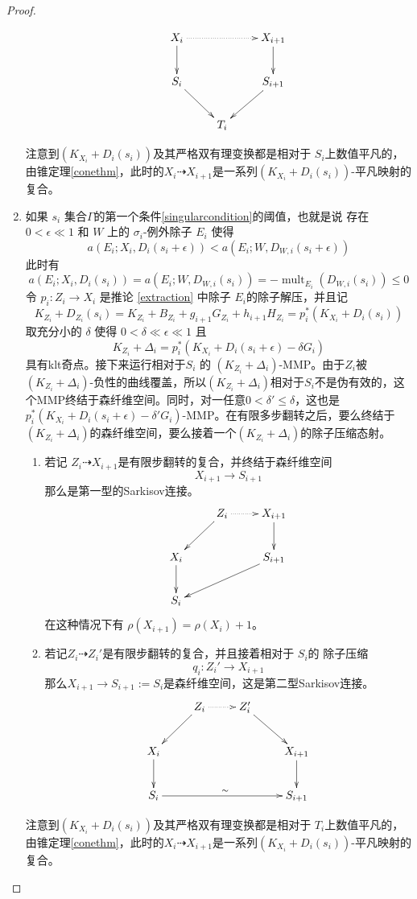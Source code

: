 \begin{proof}
\begin{enumerate}
\begin{enumerate}
      \[ \xymatrix{
          X_{i}\ar@{.>}[rr]\ar[d]& &X_{i+1}\ar[d] \\
          S_{i}\ar[rd]& & S_{i+1}\ar[ld]\\
             &T_{i}& } \]
  \end{enumerate}
  注意到$ (K_{X_{i}}+D_{i}(s_{i})) $及其严格双有理变换都是相对于 $S_{i}$上数值平凡的，由锥定理\ref{conethm}，此时的$X_{i}\dashrightarrow X_{i+1}$是一系列$ (K_{X_{i}}+D_{i}(s_{i}))$-平凡映射的复合。
    \item 如果 $s_{i}$ 集合$\Gamma$的第一个条件\ref{singularcondition}的阈值，也就是说 存在  $0<\epsilon \ll 1$ 和 $W$ 上的  $\sigma_{i}$-例外除子 $E_{i}$ 使得
  \[ a(E_{i};X_{i},D_{i}(s_{i}+\epsilon))< a(E_{i};W,D_{W,i}(s_{i}+\epsilon)) \]
  此时有
  \[ a(E_{i};X_{i},D_{i}(s_{i}))= a(E_{i};W,D_{W,i}(s_{i}))=-\operatorname{mult}_{E_{i}}(D_{W,i}(s_{i}))\leqslant 0 \]
  令 $p_{i}:Z_{i}\to X_{i}$ 是推论 \ref{extraction} 中除子 $E_{i}$的除子解压，并且记
  \[K_{Z_{i}}+D_{Z_{i}}(s_{i})=K_{Z_{i}}+B_{Z_{i}}+g_{i+1}G_{Z_{i}}+h_{i+1}H_{Z_{i}}=p_{i}^*\left(K_{X_{i}}+D_{i}\left(s_{i}\right)\right)\]
  取充分小的 $\delta$ 使得 $0<\delta \ll \epsilon \ll 1$ 且
  \[ K_{Z_{i}}+\Delta_{i}=p_{i}^*(K_{X_{i}}+D_{i}(s_{i}+\epsilon)-\delta G_{i}) \]
  具有klt奇点。接下来运行相对于$S_{i}$ 的 $(K_{Z_{i}}+\Delta_{i})$-MMP。由于$Z_{i}$被$(K_{Z_{i}}+\Delta_{i})$-负性的曲线覆盖，所以$(K_{Z_{i}}+\Delta_{i})$相对于$S_{i}$不是伪有效的，这个MMP终结于森纤维空间。同时，对一任意$0<\delta'\leqslant\delta$，这也是$p_{i}^*(K_{X_{i}}+D_{i}(s_{i}+\epsilon)-\delta'G_{i})$-MMP。在有限多步翻转之后，要么终结于$(K_{Z_{i}}+\Delta_{i})$的森纤维空间，要么接着一个$(K_{Z_{i}}+\Delta_{i})$的除子压缩态射。
  \begin{enumerate}
    \item 若记 $Z_{i}\dashrightarrow X_{i+1}$是有限步翻转的复合，并终结于森纤维空间
      \[X_{i+1}\to S_{i+1}\]
      那么是第一型的Sarkisov连接。 
      \[ \xymatrix{
        &Z_{i}\ar@{.>}[r]\ar[ld] &X_{i+1}\ar[d] \\
          X_{i}\ar[d]& &S_{i+1}\ar[lld]\\
          S_{i}   & & } \]
      在这种情况下有 $\rho(X_{i+1})=\rho(X_{i})+1$。
    \item 若记$Z_{i}\dashrightarrow Z_{i}'$是有限步翻转的复合，并且接着相对于 $S_{i}$的 除子压缩
      \[q_{i}:Z_{i}'\to X_{i+1}\]
     那么$X_{i+1}\to S_{i+1}:=S_{i}$是森纤维空间，这是第二型Sarkisov连接。
      \[ \xymatrix{
                               & Z_{i}\ar@{.>}[r]\ar[ld] & Z_{i}'\ar[rd] \\
          X_{i}\ar[d]          &                         &                  & X_{i+1}\ar[d]\\
          S_{i}\ar[rrr]^{\sim} &                         &                  & S_{i+1} } \]
  \end{enumerate}
  注意到$ (K_{X_{i}}+D_{i}(s_{i})) $及其严格双有理变换都是相对于 $T_{i}$上数值平凡的，由锥定理\ref{conethm}，此时的$X_{i}\dashrightarrow X_{i+1}$是一系列$ (K_{X_{i}}+D_{i}(s_{i}))$-平凡映射的复合。
\end{enumerate}
\end{proof}
